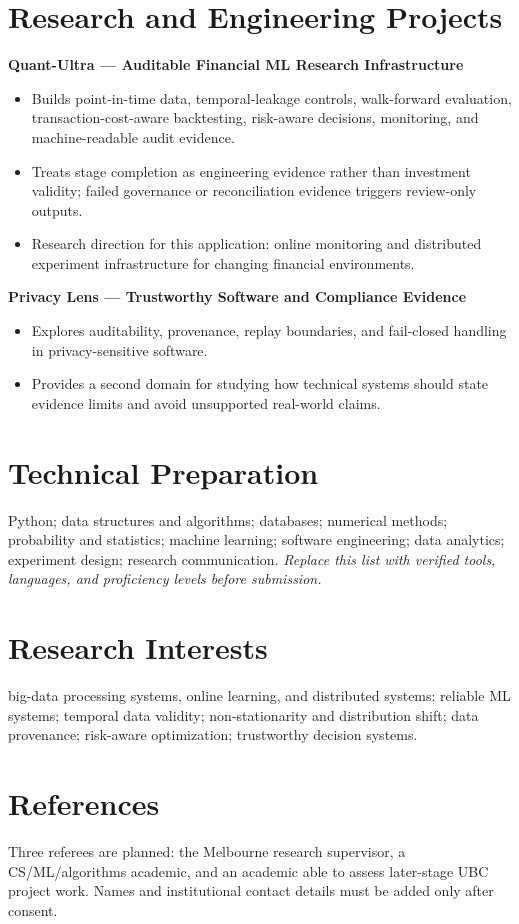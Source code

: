 \documentclass[11pt]{article}
\begin{document}
\section*{Research and Engineering Projects}
\textbf{Quant-Ultra --- Auditable Financial ML Research Infrastructure}
\begin{itemize}
\item Builds point-in-time data, temporal-leakage controls, walk-forward evaluation, transaction-cost-aware backtesting, risk-aware decisions, monitoring, and machine-readable audit evidence.
\item Treats stage completion as engineering evidence rather than investment validity; failed governance or reconciliation evidence triggers review-only outputs.
\item Research direction for this application: online monitoring and distributed experiment infrastructure for changing financial environments.
\end{itemize}

\textbf{Privacy Lens --- Trustworthy Software and Compliance Evidence}
\begin{itemize}
\item Explores auditability, provenance, replay boundaries, and fail-closed handling in privacy-sensitive software.
\item Provides a second domain for studying how technical systems should state evidence limits and avoid unsupported real-world claims.
\end{itemize}

\section*{Technical Preparation}
Python; data structures and algorithms; databases; numerical methods; probability and statistics; machine learning; software engineering; data analytics; experiment design; research communication. \textit{Replace this list with verified tools, languages, and proficiency levels before submission.}

\section*{Research Interests}
big-data processing systems, online learning, and distributed systems; reliable ML systems; temporal data validity; non-stationarity and distribution shift; data provenance; risk-aware optimization; trustworthy decision systems.

\section*{References}
Three referees are planned: the Melbourne research supervisor, a CS/ML/algorithms academic, and an academic able to assess later-stage UBC project work. Names and institutional contact details must be added only after consent.
\end{document}
